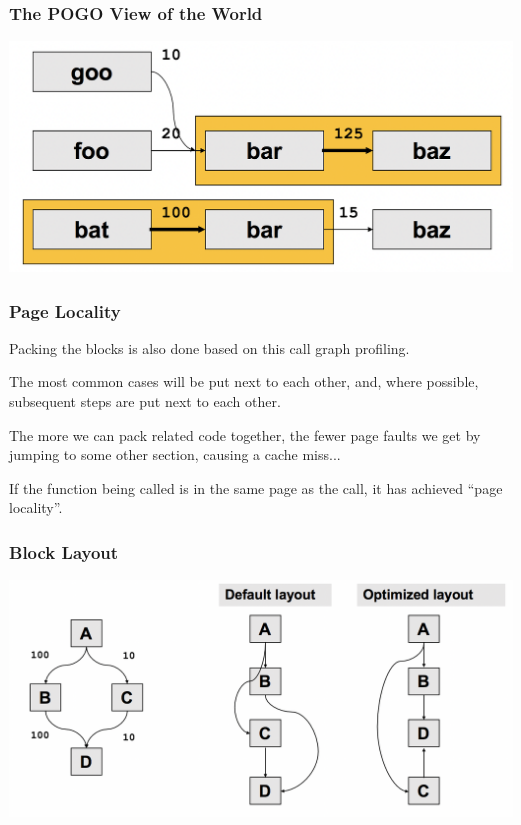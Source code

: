 \begin{frame}
\frametitle{The POGO View of the World}

\begin{center}
	\includegraphics[width=\textwidth]{images/callpaths4.png}
\end{center}

\end{frame}




\begin{frame}
\frametitle{Page Locality}

Packing the blocks is also done based on this call graph profiling. 

The most common cases will be put next to each other, and, where possible, subsequent steps are put next to each other. 

The more we can pack related code together, the fewer page faults we get by jumping to some other section, causing a cache miss... 

If the function being called is in the same page as the call, it has achieved ``page locality''.

\end{frame}



\begin{frame}
\frametitle{Block Layout}

\begin{center}
	\includegraphics[width=\textwidth]{images/blocklayout.png}
\end{center}

\end{frame}



